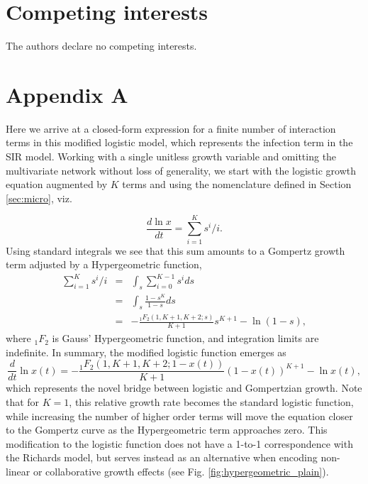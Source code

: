 \documentclass{article}
\begin{document}
\section*{Competing interests}
The authors declare no competing interests.


\section*{Appendix A}
Here we arrive at a closed-form expression for a finite number of interaction terms in this modified logistic model, which represents the infection term in the SIR model. Working with a single unitless growth variable and omitting the multivariate network without loss of generality, we start with the logistic growth equation augmented by $K$ terms and using the nomenclature defined in Section \ref{sec:micro}, viz. 

\begin{equation}
\frac{d \ln{x}}{dt} = \sum_{i=1}^K s^i/i.
\end{equation}
Using standard integrals we see that this sum amounts to a Gompertz growth term adjusted by a Hypergeometric function,
\begin{eqnarray*}
  \sum_{i=1}^K s^i/i &=& \int_s \sum_{i=0}^{K-1} s^i ds\\
  &=&\int_s \frac{1-s^K}{1-s} ds\\
  &=&- \frac{{}_{1}F_{2}({1,K+1,K+2;s})}{K+1}s^{K+1} - \ln(1-s),
\end{eqnarray*}
where ${}_1F_{2}$ is Gauss' Hypergeometric function, and integration limits are indefinite. In summary, the modified logistic function emerges as
 \begin{equation}
 \label{eq:modLogistic2}
\frac{d}{dt}\ln{x(t)} = - \frac{{}_{1}F_{2}({1,K+1,K+2;1-x(t)})}{K+1}(1-x(t))^{K+1} - \ln{x(t)},
 \end{equation}
 which represents the novel bridge between logistic and Gompertzian growth. Note that for $K=1$, this relative growth rate becomes the standard logistic function, while increasing the number of higher order terms will move the equation closer to the Gompertz curve as the Hypergeometric term approaches zero. This modification to the logistic function does not have a 1-to-1 correspondence with the Richards model, but serves instead as an alternative when encoding non-linear or collaborative growth effects (see Fig. \ref{fig:hypergeometric_plain}). 
\end{document}
